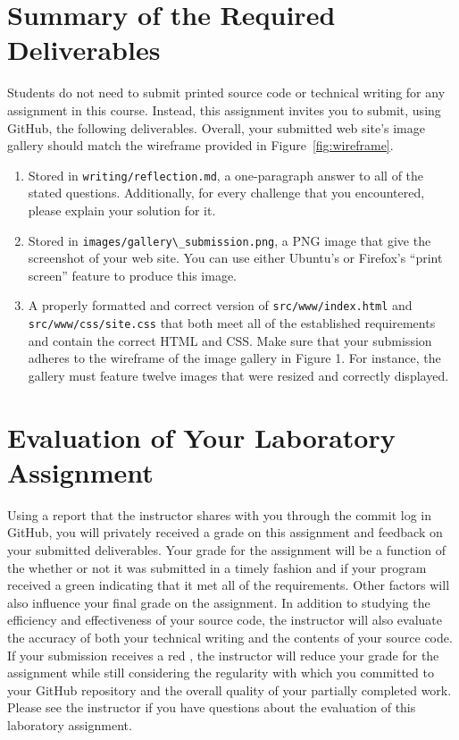 \documentclass[11pt]{article}
\newcommand{\mainprogramsource}{\lstinline{src/www/index.html}}
\newcommand{\secondprogramsource}{\lstinline{src/www/css/site.css}}
\newcommand{\reflection}{\lstinline{writing/reflection.md}}
\newcommand{\screenshot}{\lstinline{images/gallery\_submission.png}}
\newcommand{\checkmark}{\ding{51}}
\newcommand{\naughtmark}{\ding{55}}
\begin{document}
\section*{Summary of the Required Deliverables}

\noindent Students do not need to submit printed source code or technical
writing for any assignment in this course. Instead, this assignment invites you
to submit, using GitHub, the following deliverables. Overall, your submitted web
site's image gallery should match the wireframe provided in
Figure~\ref{fig:wireframe}.

\vspace*{-.1in}

\begin{enumerate}

  \setlength{\itemsep}{0in}

\item Stored in \reflection{}, a one-paragraph answer to all of the stated
  questions. Additionally, for every challenge that you encountered, please
  explain your solution for it.

\item Stored in \screenshot{}, a PNG image that give the screenshot of your web
  site. You can use either Ubuntu's or Firefox's ``print screen'' feature to
  produce this image.

\item A properly formatted and correct version of \mainprogramsource{} and
  \secondprogramsource{} that both meet all of the established requirements and
  contain the correct HTML and CSS. Make sure that your submission adheres to
  the wireframe of the image gallery in Figure 1. For instance, the gallery must
  feature twelve images that were resized and correctly displayed.

\end{enumerate}

\vspace*{-.1in}

\section*{Evaluation of Your Laboratory Assignment}

Using a report that the instructor shares with you through the commit log in
GitHub, you will privately received a grade on this assignment and feedback on
your submitted deliverables. Your grade for the assignment will be a function of
the whether or not it was submitted in a timely fashion and if your program
received a green \checkmark{} indicating that it met all of the requirements.
Other factors will also influence your final grade on the assignment. In
addition to studying the efficiency and effectiveness of your source code, the
instructor will also evaluate the accuracy of both your technical writing and
the contents of your source code. If your submission receives a red
\naughtmark{}, the instructor will reduce your grade for the assignment while
still considering the regularity with which you committed to your GitHub
repository and the overall quality of your partially completed work. Please see
the instructor if you have questions about the evaluation of this laboratory
assignment.
\end{document}
